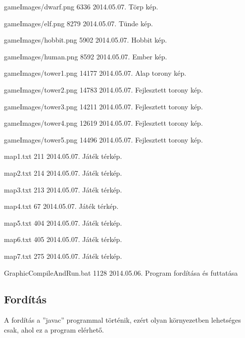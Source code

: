 \begin{fajllista}
\fajl
{gameImages/dwarf.png}
{6336}
{2014.05.07.}
{Törp kép.}

\fajl
{gameImages/elf.png}
{8279}
{2014.05.07.}
{Tünde kép.}

\fajl
{gameImages/hobbit.png}
{5902}
{2014.05.07.}
{Hobbit kép.}

\fajl
{gameImages/human.png}
{8592}
{2014.05.07.}
{Ember kép.}

\fajl
{gameImages/tower1.png}
{14177}
{2014.05.07.}
{Alap torony kép.}

\fajl
{gameImages/tower2.png}
{14783}
{2014.05.07.}
{Fejlesztett torony kép.}

\fajl
{gameImages/tower3.png}
{14211}
{2014.05.07.}
{Fejlesztett torony kép.}

\fajl
{gameImages/tower4.png}
{12619}
{2014.05.07.}
{Fejlesztett torony kép.}

\fajl
{gameImages/tower5.png}
{14496}
{2014.05.07.}
{Fejlesztett torony kép.}

\fajl
{map1.txt}
{211}
{2014.05.07.}
{Játék térkép.}

\fajl
{map2.txt}
{214}
{2014.05.07.}
{Játék térkép.}

\fajl
{map3.txt}
{213}
{2014.05.07.}
{Játék térkép.}

\fajl
{map4.txt}
{67}
{2014.05.07.}
{Játék térkép.}

\fajl
{map5.txt}
{404}
{2014.05.07.}
{Játék térkép.}

\fajl
{map6.txt}
{405}
{2014.05.07.}
{Játék térkép.}

\fajl
{map7.txt}
{275}
{2014.05.07.}
{Játék térkép.}

\fajl
{GraphicCompileAndRun.bat}
{1128}
{2014.05.06.}
{Program fordítása és futtatása}


\end{fajllista}

\lstset{escapeinside=`', xleftmargin=10pt, frame=single, basicstyle=\ttfamily\footnotesize, language=sh}

\subsection{Fordítás}


A fordítás a ''javac'' programmal történik, ezért olyan környezetben lehetséges csak, ahol ez a program elérhető. 

